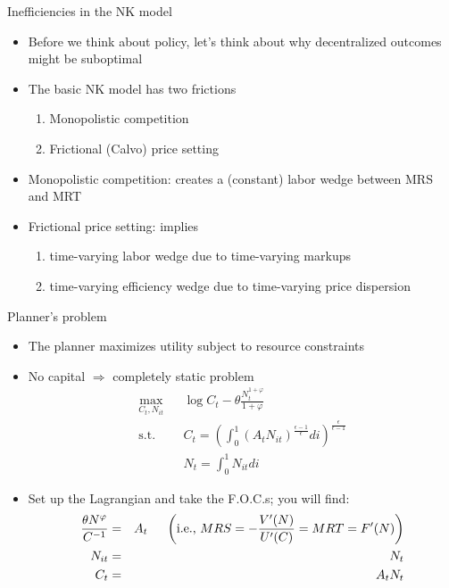 \documentclass[9pt,xcolor={dvipsnames}]{beamer}
\newcommand{\bit}{\begin{itemize}}
\newcommand{\eit}{\end{itemize}}
\newcommand{\ben}{\begin{enumerate}}
\newcommand{\een}{\end{enumerate}}
\begin{document}
\begin{frame}{Inefficiencies in the NK model}

\bit
\setlength\itemsep{1.5em}
\item Before we think about policy, let's think about why decentralized outcomes might be suboptimal

\item The basic NK model has two frictions
\ben
\setlength\itemsep{0.5em}
\item Monopolistic competition

\item Frictional (Calvo) price setting
\een

\item Monopolistic competition: creates a (constant) labor wedge between MRS and MRT

\item Frictional price setting: implies 
\ben
	\item time-varying labor wedge due to time-varying markups
	
	\item time-varying efficiency wedge due to time-varying price dispersion
\een
\eit

\end{frame}

\begin{frame}{Planner's problem}

\bit
\setlength\itemsep{1.5em}
\item The planner maximizes utility subject to resource constraints

\item No capital $\Rightarrow$ completely static problem
\begin{eqnarray}
\max_{C_t, N_{it}} && \log C_t - \theta \frac{N_t^{1+\varphi}}{1+\varphi} \nonumber \\
\text{s.t.} && C_t = \left(\int_{0}^{1} (A_t N_{it})^{\frac{\epsilon-1}{\epsilon}} di \right)^{\frac{\epsilon}{\epsilon-1}} \nonumber \\
&& N_t = \int_{0}^{1} N_{it} di \nonumber
\end{eqnarray}

\item Set up the Lagrangian and take the F.O.C.s; you will find:
\begin{eqnarray}
\frac{\theta N^{\varphi}}{C^{-1}} &=& A_t \nonumber \hspace{5mm} \left(\text{i.e., } MRS=-\frac{V'(N)}{U'(C)}=MRT=F'(N)  \right) \\
N_{it} &=& N_t \nonumber \\
C_{t} &=& A_t N_t \nonumber 
\end{eqnarray}

\eit

\end{frame}
\end{document}
